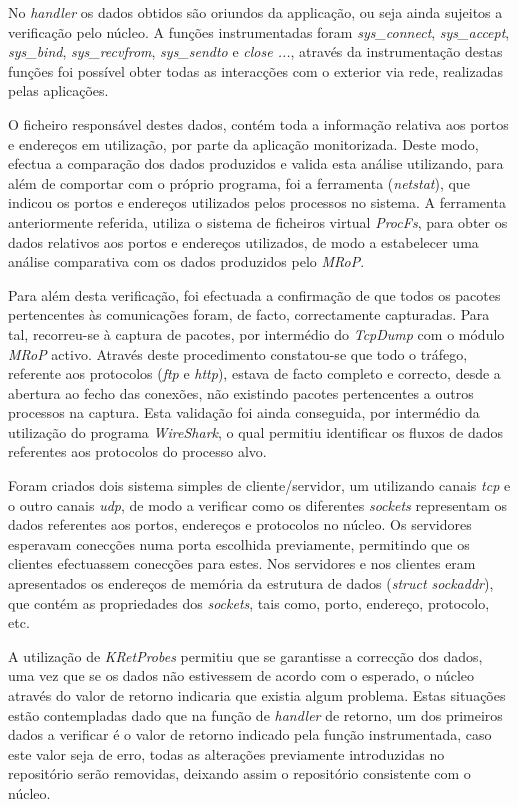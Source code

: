 No \textit{handler} os dados obtidos são oriundos da applicação, ou seja ainda sujeitos a verificação pelo núcleo.
A funções instrumentadas foram \textit{sys\_connect}, \textit{sys\_accept}, \textit{sys\_bind}, \textit{sys\_recvfrom}, \textit{sys\_sendto} e \textit{close ...}, através da instrumentação destas funções foi possível obter todas as interacções com o exterior via rede, realizadas pelas aplicações.


O ficheiro responsável destes dados, contém toda a informação relativa aos portos e endereços em utilização, por parte da aplicação monitorizada.
Deste modo, efectua a comparação dos dados produzidos e valida esta análise utilizando, para além de comportar com o próprio programa, foi a ferramenta (\textit{netstat}), que indicou os portos e endereços utilizados pelos processos no sistema.
A ferramenta anteriormente referida, utiliza o sistema de ficheiros virtual \textit{ProcFs}, para obter os dados relativos aos portos e endereços utilizados,  de modo a estabelecer uma análise comparativa com os dados produzidos pelo \textit{MRoP}.

Para além desta verificação, foi efectuada a confirmação de que todos os pacotes pertencentes às comunicações foram, de facto, correctamente capturadas.
Para tal, recorreu-se à captura de pacotes, por intermédio do \textit{TcpDump} com o módulo \textit{MRoP} activo.
Através deste procedimento constatou-se que todo o tráfego, referente aos protocolos (\textit{ftp} e \textit{http}), estava de facto completo e correcto, desde a abertura ao fecho das conexões, não existindo pacotes pertencentes a outros processos na captura.
Esta validação foi ainda conseguida, por intermédio da utilização do programa \textit{WireShark}, o qual permitiu identificar os fluxos de dados referentes aos protocolos do processo alvo.


Foram criados dois sistema simples de cliente/servidor, um utilizando canais \textit{tcp} e o outro canais \textit{udp}, de modo a verificar como os diferentes \textit{sockets} representam os dados referentes aos portos, endereços e protocolos no núcleo.
Os servidores esperavam conecções numa porta escolhida previamente, permitindo que os clientes efectuassem conecções para estes.
Nos servidores e nos clientes eram apresentados os endereços de memória da estrutura de dados (\textit{struct sockaddr}), que contém as propriedades dos \textit{sockets}, tais como, porto, endereço, protocolo, etc.

A utilização de \textit{KRetProbes} permitiu que se garantisse a correcção dos dados, uma vez que se os dados não estivessem de acordo com o esperado, o núcleo através do valor de retorno indicaria que existia algum problema.
Estas situações estão contempladas dado que na função de \textit{handler} de retorno, um dos primeiros dados a verificar é o valor de retorno indicado pela função instrumentada, caso este valor seja de erro, todas as alterações previamente introduzidas no repositório serão removidas, deixando assim o repositório consistente com o núcleo.

